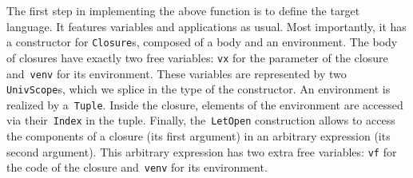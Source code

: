 \documentclass[9pt,preprint,authoryear]{sigplanconf}
\begin{document}
%
The first step in implementing the above function is to define the
    target language. It features variables and applications as usual.
    Most importantly, it has a constructor for \textcolor[rgb]{0.70,0.13,0.13}{\texttt{Closure}}s, composed
    of a body and an environment. The body of closures have exactly two
    free variables{:} \textcolor[rgb]{0,0,0.80}{\texttt{vx}} for the parameter of the closure and{~}\textcolor[rgb]{0,0,0.80}{\texttt{venv}}    for its environment.
    These variables are represented
    by two \textcolor[rgb]{0,0,0.80}{\texttt{UnivScope}}s, which we splice in the type of the constructor.
    An environment is realized by a{~}\textcolor[rgb]{0.70,0.13,0.13}{\texttt{Tuple}}.
    Inside the closure, elements of the environment are accessed via
    their{~}\textcolor[rgb]{0.70,0.13,0.13}{\texttt{Index}} in the tuple. Finally, the{~}\textcolor[rgb]{0.70,0.13,0.13}{\texttt{LetOpen}} construction
    allows to access the components of a closure (its first argument)
    in an arbitrary expression (its second argument). This arbitrary
    expression has two extra free variables{:} \textcolor[rgb]{0,0,0.80}{\texttt{vf}} for the code of the
    closure and{~}\textcolor[rgb]{0,0,0.80}{\texttt{venv}} for its environment.


{\nopagebreak }
\end{document}
